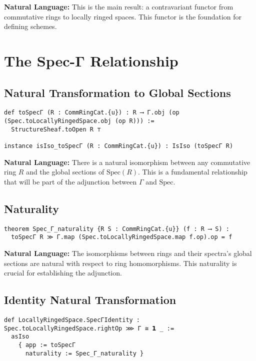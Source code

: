\documentclass{article}
\theoremstyle{definition}
\begin{document}
\textbf{Natural Language:} This is the main result: a contravariant functor from commutative rings to locally ringed spaces. This functor is the foundation for defining schemes.

\section{The Spec-Γ Relationship}

\subsection{Natural Transformation to Global Sections}

\begin{lstlisting}
def toSpecΓ (R : CommRingCat.{u}) : R ⟶ Γ.obj (op (Spec.toLocallyRingedSpace.obj (op R))) :=
  StructureSheaf.toOpen R ⊤

instance isIso_toSpecΓ (R : CommRingCat.{u}) : IsIso (toSpecΓ R)
\end{lstlisting}

\textbf{Natural Language:} There is a natural isomorphism between any commutative ring $R$ and the global sections of $\mathrm{Spec}(R)$. This is a fundamental relationship that will be part of the adjunction between $\Gamma$ and $\mathrm{Spec}$.

\subsection{Naturality}

\begin{lstlisting}
theorem Spec_Γ_naturality {R S : CommRingCat.{u}} (f : R ⟶ S) :
  toSpecΓ R ≫ Γ.map (Spec.toLocallyRingedSpace.map f.op).op = f
\end{lstlisting}

\textbf{Natural Language:} The isomorphisms between rings and their spectra's global sections are natural with respect to ring homomorphisms. This naturality is crucial for establishing the adjunction.

\subsection{Identity Natural Transformation}

\begin{lstlisting}
def LocallyRingedSpace.SpecΓIdentity : Spec.toLocallyRingedSpace.rightOp ⋙ Γ ≅ 𝟭 _ :=
  asIso
    { app := toSpecΓ
      naturality := Spec_Γ_naturality }
\end{lstlisting}
\end{document}
